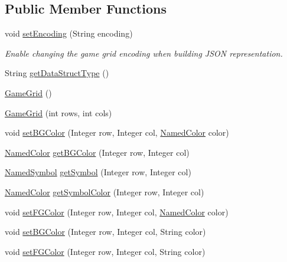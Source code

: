 \subsection*{Public Member Functions}
\begin{DoxyCompactItemize}
\item 
void \hyperlink{classbridges_1_1base_1_1_game_grid_a2281cfd7d61dc9903c9b1358c9767a1e}{set\+Encoding} (String encoding)
\begin{DoxyCompactList}\small\item\em Enable changing the game grid encoding when building J\+S\+ON representation. \end{DoxyCompactList}\item 
String \hyperlink{classbridges_1_1base_1_1_game_grid_a4d88979ac0f74f212392c5efe1400916}{get\+Data\+Struct\+Type} ()
\item 
\hyperlink{classbridges_1_1base_1_1_game_grid_a0b5330e66b504eddc00617c5f1fa6240}{Game\+Grid} ()
\item 
\hyperlink{classbridges_1_1base_1_1_game_grid_acfe6d52979dae94b1d883fed4965feb3}{Game\+Grid} (int rows, int cols)
\item 
void \hyperlink{classbridges_1_1base_1_1_game_grid_a72d7d5b03b78fdc4110cee955727a523}{set\+B\+G\+Color} (Integer row, Integer col, \hyperlink{enumbridges_1_1base_1_1_named_color}{Named\+Color} color)
\item 
\hyperlink{enumbridges_1_1base_1_1_named_color}{Named\+Color} \hyperlink{classbridges_1_1base_1_1_game_grid_abf8435b464054c1f290985b05ce7cd97}{get\+B\+G\+Color} (Integer row, Integer col)
\item 
\hyperlink{enumbridges_1_1base_1_1_named_symbol}{Named\+Symbol} \hyperlink{classbridges_1_1base_1_1_game_grid_a974e33d5561a8f214966be626a9ca8ca}{get\+Symbol} (Integer row, Integer col)
\item 
\hyperlink{enumbridges_1_1base_1_1_named_color}{Named\+Color} \hyperlink{classbridges_1_1base_1_1_game_grid_ab094ebfd585aac9440836ad6875ce094}{get\+Symbol\+Color} (Integer row, Integer col)
\item 
void \hyperlink{classbridges_1_1base_1_1_game_grid_a105b46f68bcc9413889e7255318bab4c}{set\+F\+G\+Color} (Integer row, Integer col, \hyperlink{enumbridges_1_1base_1_1_named_color}{Named\+Color} color)
\item 
void \hyperlink{classbridges_1_1base_1_1_game_grid_ad655bef3f2c24cc19f222b86b5d31373}{set\+B\+G\+Color} (Integer row, Integer col, String color)
\item 
void \hyperlink{classbridges_1_1base_1_1_game_grid_a860f2669ba46bc7691f4bb5c7adf907b}{set\+F\+G\+Color} (Integer row, Integer col, String color)

\end{DoxyCompactItemize}
